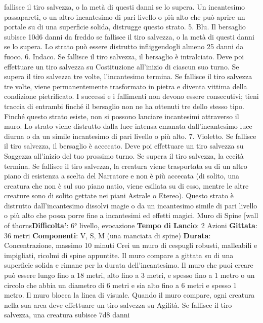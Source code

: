 \begin{multicols}{2}
fallisce il tiro salvezza, o la metà di questi danni se lo
supera. Un incantesimo passapareti, o un altro
incantesimo di pari livello o più alto che può aprire un
portale su di una superficie solida, distrugge questo
strato.
5. Blu. Il bersaglio subisce 10d6 danni da freddo se
fallisce il tiro salvezza, o la metà di questi danni se lo
supera. Lo strato può essere distrutto infliggendogli
almeno 25 danni da fuoco.
6. Indaco. Se fallisce il tiro salvezza, il bersaglio è
intralciato. Deve poi effettuare un tiro salvezza su
Costituzione all’inizio di ciascun suo turno. Se supera il
tiro salvezza tre volte, l’incantesimo termina. Se fallisce
il tiro salvezza tre volte, viene permanentemente
trasformato in pietra e diventa vittima della condizione
pietrificato. I successi e i fallimenti non devono essere
consecutivi; tieni traccia di entrambi finché il bersaglio
non ne ha ottenuti tre dello stesso tipo.
Finché questo strato esiste, non si possono lanciare
incantesimi attraverso il muro. Lo strato viene distrutto
dalla luce intensa emanata dall’incantesimo luce diurna
o da un simile incantesimo di pari livello o più alto.
7. Violetto. Se fallisce il tiro salvezza, il bersaglio è
accecato. Deve poi effettuare un tiro salvezza su
Saggezza all’inizio del tuo prossimo turno. Se supera il
tiro salvezza, la cecità termina. Se fallisce il tiro
salvezza, la creatura viene trasportata su di un altro
piano di esistenza a scelta del Narratore e non è più accecata
(di solito, una creatura che non è sul suo piano natio,
viene esiliata su di esso, mentre le altre creature sono
di solito gettate nei piani Astrale o Etereo). Questo
strato è distrutto dall’incantesimo dissolvi magie o da un
incantesimo simile di pari livello o più alto che possa
porre fine a incantesimi ed effetti magici.
Muro di Spine
[wall of thorns\textbf{Difficolta'}:
6° livello, evocazione
\textbf{Tempo di Lancio}: 2 Azioni
\textbf{Gittata}: 36 metri
\textbf{Componenti}: V, S, M (una manciata di spine)
\textbf{Durata}: Concentrazione, massimo 10 minuti
Crei un muro di cespugli robusti, malleabili e impigliati,
ricolmi di spine appuntite. Il muro compare a gittata su
di una superficie solida e rimane per la durata
dell’incantesimo. Il muro che puoi creare può essere
lungo fino a 18 metri, alto fino a 3 metri, e spesso fino a
1 metro o un circolo che abbia un diametro di 6 metri e
sia alto fino a 6 metri e spesso 1 metro. Il muro blocca
la linea di visuale.
Quando il muro compare, ogni creatura nella sua area
deve effettuare un tiro salvezza su Agilità. Se
fallisce il tiro salvezza, una creatura subisce 7d8 danni

\end{multicols}
